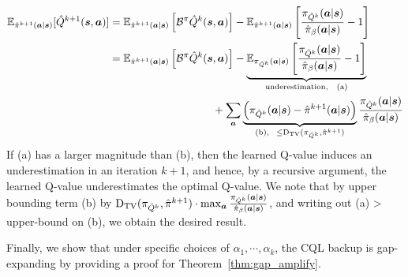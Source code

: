 \begin{align*}
    \mathbb{E}_{\hat{\pi}^{k+1}(\boldsymbol{a}|\boldsymbol{s})}[\hat{Q}^{k+1}(\boldsymbol{s}, \boldsymbol{a})] &=  \mathbb{E}_{\hat{\pi}^{k+1}(\boldsymbol{a}|\boldsymbol{s})}\left[ \mathcal{B}^\pi \hat{Q}^k (\boldsymbol{s}, \boldsymbol{a}) \right] - \mathbb{E}_{\hat{\pi}^{k+1}(\boldsymbol{a}|\boldsymbol{s})}\left[ \frac{\pi_{\hat{Q}^k}(\boldsymbol{a} | \boldsymbol{s})}{\hat{\pi}_\beta(\boldsymbol{a}|\boldsymbol{s})} -1 \right]\\
    &= \mathbb{E}_{\hat{\pi}^{k+1}(\boldsymbol{a}|\boldsymbol{s})}\left[ \mathcal{B}^\pi \hat{Q}^k (\boldsymbol{s}, \boldsymbol{a}) \right] - \underbrace{\mathbb{E}_{\pi_{\hat{Q}^k}(\boldsymbol{a} | \boldsymbol{s})}\left[ \frac{\pi_{\hat{Q}^k}(\boldsymbol{a} | \boldsymbol{s})}{\hat{\pi}_\beta(\boldsymbol{a}|\boldsymbol{s})} -1 \right]}_{\text{underestimation, ~~(a)}}\\
    &~~~~~~~~~~~~~~~~~~~~~~~~~~~~~+ \sum_{\boldsymbol{a}} \underbrace{\left(\pi_{\hat{Q}^k}(\boldsymbol{a} | \boldsymbol{s}) - \hat{\pi}^{k+1}(\boldsymbol{a}|\boldsymbol{s}) \right)}_{\text{(b),}~~{\leq \mathrm{D_{TV}}(\pi_{\hat{Q}^k}, \hat{\pi}^{k+1})}} \frac{\pi_{\hat{Q}^k}(\boldsymbol{a} | \boldsymbol{s})}{\hat{\pi}_\beta(\boldsymbol{a}|\boldsymbol{s})}
\end{align*}
If (a) has a larger magnitude than (b), then the learned Q-value induces an underestimation in an iteration $k+1$, and hence, by a recursive argument, the learned Q-value underestimates the optimal Q-value. We note that by upper bounding term (b) by $\mathrm{D_{TV}}(\pi_{\hat{Q}^k}, \hat{\pi}^{k+1}) \cdot \max_{\boldsymbol{a}} \frac{\pi_{\hat{Q}^k}(\boldsymbol{a} | \boldsymbol{s})}{\hat{\pi}_\beta(\boldsymbol{a}|\boldsymbol{s})}$, and writing out (a) > upper-bound on (b), we obtain the desired result.


Finally, we show that under specific choices of $\alpha_1, \cdots, \alpha_k$, the CQL backup is gap-expanding by providing a proof for Theorem~\ref{thm:gap_amplify}.

~



